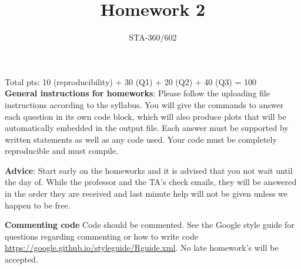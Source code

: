 \documentclass{article}
\begin{document}
\title{Homework 2}
\author{STA-360/602}
\date{}
\maketitle

Total pts: 10 (reproducibility) + 30 (Q1) + 20 (Q2) + 40 (Q3) = 100\\

\textbf{General instructions for homeworks}: Please follow the uploading file instructions according to the syllabus. You will give the commands to answer each question in its own code block, which will also produce plots that will be automatically embedded in the output file. Each answer must be supported by written statements as well as any code used. Your code must be completely reproducible and must compile. 

\textbf{Advice}: Start early on the homeworks and it is advised that you not wait until the day of. While the professor and the TA's check emails, they will be answered in the order they are received and last minute help will not be given unless we happen to be free.  

\textbf{Commenting code}
Code should be commented. See the Google style guide for questions regarding commenting or how to write 
code \url{https://google.github.io/styleguide/Rguide.xml}. No late homework's will be accepted.

\vspace*{1em}
\end{document}
